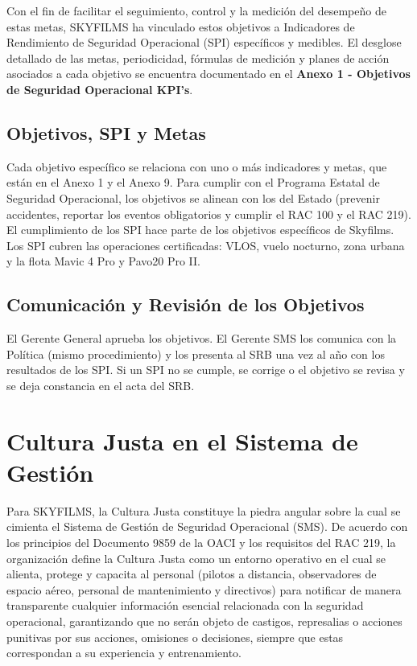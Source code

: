 Con el fin de facilitar el seguimiento, control y la medición del desempeño de estas metas, SKYFILMS ha vinculado estos objetivos a Indicadores de Rendimiento de Seguridad Operacional (SPI) específicos y medibles. El desglose detallado de las metas, periodicidad, fórmulas de medición y planes de acción asociados a cada objetivo se encuentra documentado en el \textbf{Anexo 1 - Objetivos de Seguridad Operacional KPI's}.


\subsection{Objetivos, SPI y Metas}
Cada objetivo específico se relaciona con uno o más indicadores y metas, que están en el Anexo 1 y el Anexo 9. Para cumplir con el Programa Estatal de Seguridad Operacional, los objetivos se alinean con los del Estado (prevenir accidentes, reportar los eventos obligatorios y cumplir el RAC 100 y el RAC 219). El cumplimiento de los SPI hace parte de los objetivos específicos de Skyfilms. Los SPI cubren las operaciones certificadas: VLOS, vuelo nocturno, zona urbana y la flota Mavic 4 Pro y Pavo20 Pro II.

\subsection{Comunicación y Revisión de los Objetivos}
El Gerente General aprueba los objetivos. El Gerente SMS los comunica con la Política (mismo procedimiento) y los presenta al SRB una vez al año con los resultados de los SPI. Si un SPI no se cumple, se corrige o el objetivo se revisa y se deja constancia en el acta del SRB.

 \section{Cultura Justa en el Sistema de Gestión}
Para SKYFILMS, la Cultura Justa constituye la piedra angular sobre la cual se cimienta el Sistema de Gestión de Seguridad Operacional (SMS). De acuerdo con los principios del Documento 9859 de la OACI y los requisitos del RAC 219, la organización define la Cultura Justa como un entorno operativo en el cual se alienta, protege y capacita al personal (pilotos a distancia, observadores de espacio aéreo, personal de mantenimiento y directivos) para notificar de manera transparente cualquier información esencial relacionada con la seguridad operacional, garantizando que no serán objeto de castigos, represalias o acciones punitivas por sus acciones, omisiones o decisiones, siempre que estas correspondan a su experiencia y entrenamiento.\\

